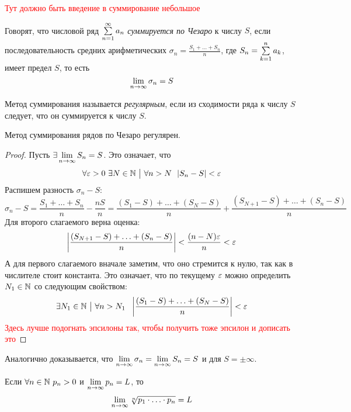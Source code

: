\begin{example}
	\textcolor{red}{Тут должно быть введение в суммирование небольшое}
\end{example}

\begin{definition}
	Говорят, что числовой ряд $\sum\limits_{n = 1}^\infty a_n$ \textit{суммируется по Чезаро} к числу $S$, если последовательность средних арифметических $\sigma_n = \frac{S_1 + \ldots + S_n}{n}$, где $S_n = \sum\limits_{k = 1}^n a_k$, имеет предел $S$, то есть
	\[
		\lim\limits_{n \to \infty} \sigma_n = S
	\]
\end{definition}

\begin{definition}
	Метод суммирования называется \textit{регулярным}, если из сходимости ряда к числу $S$ следует, что он суммируется к числу $S$.
\end{definition}

\begin{theorem}
	Метод суммирования рядов по Чезаро регулярен.
\end{theorem}

\begin{proof}
	Пусть $\exists \lim\limits_{n \to \infty} S_n = S$. Это означает, что
	\[
		\forall \varepsilon > 0\ \exists N \in \mathbb{N} \ \big|\  \forall n > N\ \ |S_n - S| < \varepsilon
	\]
	Распишем разность $\sigma_n - S$:
	\[
		\sigma_n - S = \frac{S_1 + \ldots + S_n}{n} - \frac{nS}{n} = \frac{(S_1 - S) + \ldots + (S_N - S)}{n} + \frac{(S_{N + 1} - S) + \ldots + (S_n - S)}{n}
	\]
	Для второго слагаемого верна оценка:
	\[
		\left|\frac{(S_{N + 1} - S) + \ldots + (S_n - S)}{n}\right| < \frac{(n - N)\varepsilon}{n} < \varepsilon
	\]
	А для первого слагаемого вначале заметим, что оно стремится к нулю, так как в числителе стоит константа. Это означает, что по текущему $\varepsilon$ можно определить $N_1 \in \mathbb{N}$ со следующим свойством:
	\[
		\exists N_1 \in \N \such \forall n > N_1\ \ \left|\frac{(S_1 - S) + \ldots + (S_N - S)}{n}\right| < \eps
	\]
	\textcolor{red}{Здесь лучше подогнать эпсилоны так, чтобы получить тоже эпсилон и дописать это}
\end{proof}

\begin{note}
	Аналогично доказывается, что $\lim\limits_{n \to \infty} \sigma_n = \lim\limits_{n \to \infty} S_n = S$ и для $S = \pm \infty$.
\end{note}

\begin{corollary}
	Если $\forall n \in \mathbb{N}\ p_n > 0$ и $\lim\limits_{n \to \infty} p_n = L$, то
	\[
		\lim\limits_{n \to \infty} \sqrt[n]{p_1 \cdot \ldots \cdot p_n} = L
	\]
\end{corollary}

